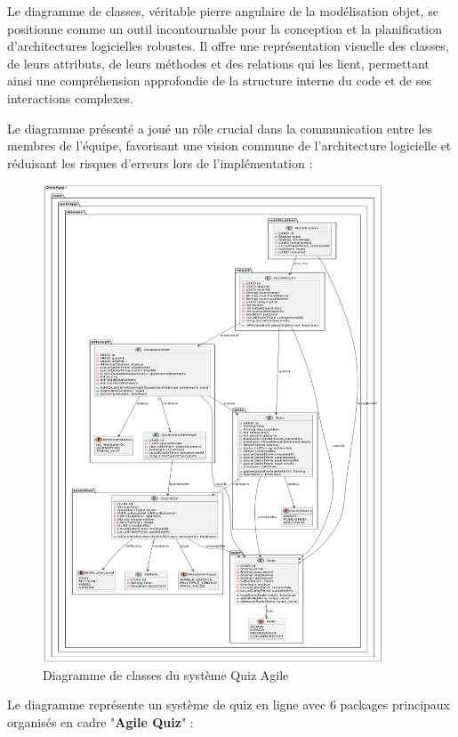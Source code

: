 \documentclass[12pt,a4paper]{report}
\begin{document}
Le diagramme de classes, véritable pierre angulaire de la modélisation objet, se positionne comme un outil incontournable pour la conception et la planification d'architectures logicielles robustes. Il offre une représentation visuelle des classes, de leurs attributs, de leurs méthodes et des relations qui les lient, permettant ainsi une compréhension approfondie de la structure interne du code et de ses interactions complexes.

Le diagramme présenté a joué un rôle crucial dans la communication entre les membres de l'équipe, favorisant une vision commune de l'architecture logicielle et réduisant les risques d'erreurs lors de l'implémentation :

\begin{figure}[H]
\centering
\includegraphics[width=0.9\textwidth]{latex_media/media/image16.png}
\caption{Diagramme de classes du système Quiz Agile}
\label{fig:diagramme-classes}
\end{figure}

Le diagramme représente un système de quiz en ligne avec 6 packages principaux organisés en cadre "\textbf{Agile Quiz}" :
\end{document}
